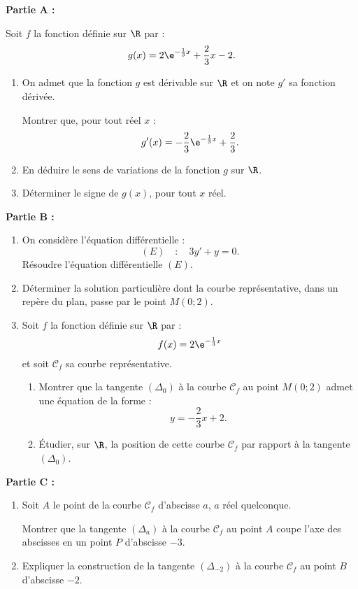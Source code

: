 \textbf{Partie A :}

\medskip

Soit $f$ la fonction définie sur $\R$ par : \[ g(x)=2\e^{-\frac13x}+\dfrac23x-2. \]
\begin{enumerate}
	\item On admet que la fonction $g$ est dérivable sur $\R$ et on note $g'$ sa fonction dérivée.
	
	Montrer que, pour tout réel $x$ : \[ g'(x)=-\dfrac23 \e^{-\frac13x}+\dfrac23. \]
	\item En déduire le sens de variations de la fonction $g$ sur $\R$.
	\item Déterminer le signe de $g(x)$, pour tout $x$ réel.
\end{enumerate}

\smallskip

\textbf{Partie B :}

\begin{enumerate}
	\item On considère l’équation différentielle : \[ (E) \quad : \quad 3y'+y=0. \]
	Résoudre l’équation différentielle $(E)$.
	\item Déterminer la solution particulière dont la courbe représentative, dans un repère du plan, passe par le point $M(0;2)$.
	\item Soit $f$ la fonction définie sur $\R$ par : \[ f(x)=2\e^{-\frac13x} \] et soit $\mathcal{C}_f$ sa courbe représentative.
	\begin{enumerate}
		\item Montrer que la tangente $(\Delta_0)$ à la courbe $\mathcal{C}_f$ au point $M(0;2)$ admet une équation de la forme : \[ y=-\dfrac23x+2. \]
		\item Étudier, sur $\R$, la position de cette courbe $\mathcal{C}_f$ par rapport à la tangente $(\Delta_0)$.
	\end{enumerate}
\end{enumerate}

\smallskip

\textbf{Partie C :}

\begin{enumerate}
	\item Soit $A$ le point de la courbe $\mathcal{C}_f$ d’abscisse $a$, $a$ réel quelconque.
	
	Montrer que la tangente $(\Delta_a)$ à la courbe $\mathcal{C}_f$ au point $A$ coupe l’axe des
	abscisses en un point $P$ d’abscisse $-3$.
	\item Expliquer la construction de la tangente $(\Delta_{-2})$ à la courbe $\mathcal{C}_f$ au point $B$ d’abscisse $-2$.
\end{enumerate}